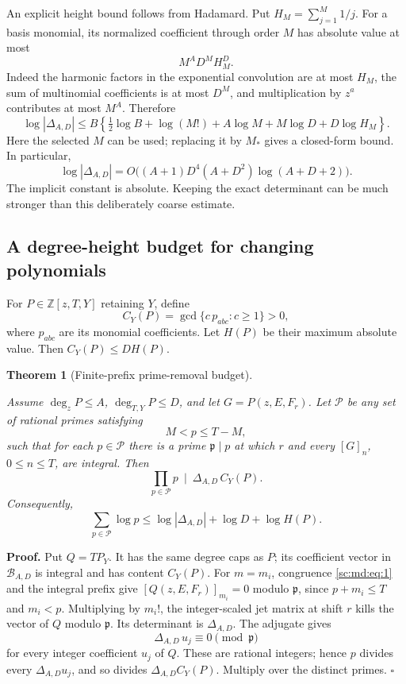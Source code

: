 \documentclass[11pt,a4paper]{article}
\newtheorem{theorem}{Theorem}[section]
\theoremstyle{definition}
\theoremstyle{remark}
\theoremstyle{plain}
\numberwithin{equation}{section}
\begin{document}
An explicit height bound follows from Hadamard. Put
\(H_M=\sum_{j=1}^M1/j\). For a basis monomial, its normalized
coefficient through order \(M\) has absolute value at most \[
M^A D^M H_M^D.
\] Indeed the harmonic factors in the exponential convolution are at
most \(H_M\), the sum of multinomial coefficients is at most \(D^M\), and
multiplication by \(z^a\) contributes at most \(M^A\). Therefore \[
\boxed{\log|\Delta_{A,D}|\le
B\left\{\tfrac12\log B+\log(M!)+A\log M
+M\log D+D\log H_M\right\}.}\tag{MD.3}\label{sc:md:eq:3}
\] Here the selected \(M\) can be used; replacing it by \(M_*\) gives a
closed-form bound. In particular, \[
\log|\Delta_{A,D}|=
O\bigl((A+1)D^4(A+D^2)\log(A+D+2)\bigr).\tag{MD.4}\label{sc:md:eq:4}
\] The implicit constant is absolute. Keeping the exact determinant can
be much stronger than this deliberately coarse estimate.

\subsection{A degree-height budget for changing
polynomials}\label{sc:md:a-degree-height-budget-for-changing-polynomials}

For \(P\in\mathbb Z[z,T,Y]\) retaining \(Y\), define \[
C_Y(P)=\gcd\{c\,p_{abc}:c\ge1\}>0,
\] where \(p_{abc}\) are its monomial coefficients. Let \(H(P)\) be
their maximum absolute value. Then \(C_Y(P)\le D H(P)\).

\begin{theorem}[Finite-prefix prime-removal budget]\label{sc:md:finite-budget}

Assume \(\deg_zP\le A\), \(\deg_{T,Y}P\le D\), and let \(G=P(z,E,F_r)\).
Let \(\mathcal P\) be any set of rational primes satisfying \[
M<p\le T-M,
\] such that for each \(p\in\mathcal P\) there is a prime
\(\mathfrak p\mid p\) at which \(r\) and every \([G]_n\),
\(0\le n\le T\), are integral. Then \[
\boxed{\prod_{p\in\mathcal P}p\ \mid\
\Delta_{A,D}\,C_Y(P).}\tag{MD.5}\label{sc:md:eq:5}
\] Consequently, \[
\boxed{\sum_{p\in\mathcal P}\log p
\le\log|\Delta_{A,D}|+\log D+\log H(P).}\tag{MD.6}\label{sc:md:eq:6}
\]

\end{theorem}
\textbf{Proof.} Put \(Q=TP_Y\). It has the same degree caps as \(P\);
its coefficient vector in \(\mathcal B_{A,D}\) is integral and has
content \(C_Y(P)\). For \(m=m_i\), congruence \eqref{sc:md:eq:1} and the integral
prefix give \([Q(z,E,F_r)]_{m_i}=0\) modulo \(\mathfrak p\), since
\(p+m_i\le T\) and \(m_i<p\). Multiplying by \(m_i!\), the
integer-scaled jet matrix at shift \(r\) kills the vector of \(Q\)
modulo \(\mathfrak p\). Its determinant is \(\Delta_{A,D}\). The
adjugate gives \[
\Delta_{A,D}\,u_j\equiv0\pmod{\mathfrak p}
\] for every integer coefficient \(u_j\) of \(Q\). These are rational
integers; hence \(p\) divides every \(\Delta_{A,D}u_j\), and so divides
\(\Delta_{A,D}C_Y(P)\). Multiply over the distinct primes. \(\square\)
\end{document}
